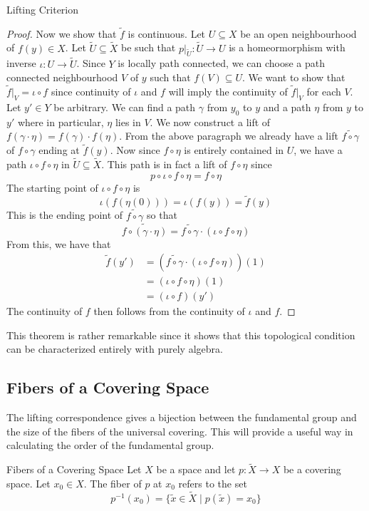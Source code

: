 \documentclass[a4paper]{article}
\begin{document}
\begin{thm}{Lifting Criterion}{}
\begin{proof}
Now we show that $\widetilde{f}$ is continuous. Let $U\subseteq X$ be an open neighbourhood of $f(y)\in X$. Let $\widetilde{U}\subseteq\widetilde{X}$ be such that $p|_{\widetilde{U}}:\widetilde{U}\to U$ is a homeormorphism with inverse $\iota:U\to\widetilde{U}$. Since $Y$ is locally path connected, we can choose a path connected neighbourhood $V$ of $y$ such that $f(V)\subseteq U$. We want to show that $\widetilde{f}|_V=\iota\circ f$ since continuity of $\iota$ and $f$ will imply the continuity of $\widetilde{f}|_V$ for each $V$. Let $y'\in Y$ be arbitrary. We can find a path $\gamma$ from $y_0$ to $y$ and a path $\eta$ from $y$ to $y'$ where in particular, $\eta$ lies in $V$. We now construct a lift of $f(\gamma\cdot\eta)=f(\gamma)\cdot f(\eta)$. From the above paragraph we already have a lift $\widetilde{f\circ\gamma}$ of $f\circ\gamma$ ending at $\widetilde{f}(y)$. Now since $f\circ\eta$ is entirely contained in $U$, we have a path $\iota\circ f\circ\eta$ in $\widetilde{U}\subseteq\widetilde{X}$. This path is in fact a lift of $f\circ\eta$ since $$p\circ\iota\circ f\circ\eta=f\circ\eta$$ The starting point of $\iota\circ f\circ\eta$ is $$\iota(f(\eta(0)))=\iota(f(y))=\widetilde{f}(y)$$ This is the ending point of $\widetilde{f\circ\gamma}$ so that $$\widetilde{f\circ(\gamma\cdot\eta)}=\widetilde{f\circ\gamma}\cdot(\iota\circ f\circ\eta)$$ From this, we have that 
\begin{align*}
\widetilde{f}(y')&=\left(\widetilde{f\circ\gamma}\cdot(\iota\circ f\circ\eta)\right)(1)\\
&=\left(\iota\circ f\circ\eta\right)(1)\\
&=(\iota\circ f)(y')
\end{align*}
The continuity of $f$ then follows from the continuity of $\iota$ and $f$. 
\end{proof}
\end{thm}

This theorem is rather remarkable since it shows that this topological condition can be characterized entirely with purely algebra. 

\subsection{Fibers of a Covering Space}
The lifting correspondence gives a bijection between the fundamental group and the size of the fibers of the universal covering. This will provide a useful way in calculating the order of the fundamental group. 

\begin{defn}{Fibers of a Covering Space}{} Let $X$ be a space and let $p:\widetilde{X}\to X$ be a covering space. Let $x_0\in X$. The fiber of $p$ at $x_0$ refers to the set $$p^{-1}(x_0)=\{\widetilde{x}\in\widetilde{X}\;|\;p(\widetilde{x})=x_0\}$$
\end{defn}
\end{document}
